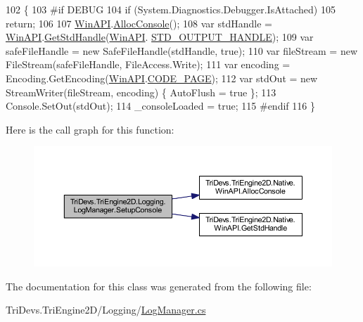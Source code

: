 \begin{DoxyCode}
102         \{
103 \textcolor{preprocessor}{#if DEBUG}
104 \textcolor{preprocessor}{}            \textcolor{keywordflow}{if} (System.Diagnostics.Debugger.IsAttached)
105                 \textcolor{keywordflow}{return};
106 
107             \hyperlink{class_tri_devs_1_1_tri_engine2_d_1_1_native_1_1_win_a_p_i}{WinAPI}.\hyperlink{class_tri_devs_1_1_tri_engine2_d_1_1_native_1_1_win_a_p_i_a00f0889a729e989fbefd8267a20a1c06}{AllocConsole}();
108             var stdHandle = \hyperlink{class_tri_devs_1_1_tri_engine2_d_1_1_native_1_1_win_a_p_i}{WinAPI}.\hyperlink{class_tri_devs_1_1_tri_engine2_d_1_1_native_1_1_win_a_p_i_a7617bf77270291625f566cf21294d518}{GetStdHandle}(\hyperlink{class_tri_devs_1_1_tri_engine2_d_1_1_native_1_1_win_a_p_i}{WinAPI}.
      \hyperlink{class_tri_devs_1_1_tri_engine2_d_1_1_native_1_1_win_a_p_i_a19ebb40d1edf46781ea0fdf4a9c94e8b}{STD\_OUTPUT\_HANDLE});
109             var safeFileHandle = \textcolor{keyword}{new} SafeFileHandle(stdHandle, \textcolor{keyword}{true});
110             var fileStream = \textcolor{keyword}{new} FileStream(safeFileHandle, FileAccess.Write);
111             var encoding = Encoding.GetEncoding(\hyperlink{class_tri_devs_1_1_tri_engine2_d_1_1_native_1_1_win_a_p_i}{WinAPI}.\hyperlink{class_tri_devs_1_1_tri_engine2_d_1_1_native_1_1_win_a_p_i_a83ef0d2539e95cc640d8e1f1216beec5}{CODE\_PAGE});
112             var stdOut = \textcolor{keyword}{new} StreamWriter(fileStream, encoding) \{ AutoFlush = \textcolor{keyword}{true} \};
113             Console.SetOut(stdOut);
114             \_consoleLoaded = \textcolor{keyword}{true};
115 \textcolor{preprocessor}{#endif}
116 \textcolor{preprocessor}{}        \}
\end{DoxyCode}


Here is the call graph for this function\-:\nopagebreak
\begin{figure}[H]
\begin{center}
\leavevmode
\includegraphics[width=350pt]{class_tri_devs_1_1_tri_engine2_d_1_1_logging_1_1_log_manager_a674a0fcc99cd6101fbe655e626d3f24b_cgraph}
\end{center}
\end{figure}




The documentation for this class was generated from the following file\-:\begin{DoxyCompactItemize}
\item 
Tri\-Devs.\-Tri\-Engine2\-D/\-Logging/\hyperlink{_log_manager_8cs}{Log\-Manager.\-cs}\end{DoxyCompactItemize}
